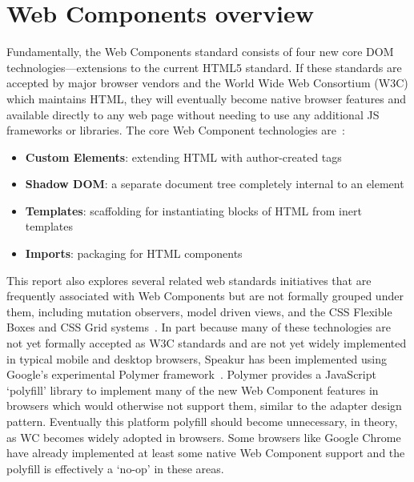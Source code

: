 \section{Web Components overview}
Fundamentally, the Web Components standard consists of four new core DOM technologies---extensions to the current HTML5 standard.
If these standards are accepted by major browser vendors and the World Wide Web Consortium (W3C)
which maintains HTML, 
they will eventually become native browser features and available directly to any web page without needing to use any additional JS frameworks or libraries. 
The core Web Component technologies are~\cite{penades2015}:
\begin{itemize}
\item
\textbf{Custom Elements}: extending HTML with author-created tags
\item
\textbf{Shadow DOM}: a separate document tree completely internal to an element
\item
\textbf{Templates}: scaffolding for instantiating blocks of HTML from inert templates
\item
\textbf{Imports}: packaging for HTML components
\end{itemize}

This report also explores several related web standards initiatives that are frequently associated with Web Components 
but are not formally grouped under them, including mutation observers,
model driven views, 
and the CSS Flexible Boxes
and CSS Grid
systems~\cite{w3ccontributors2014,w3ccontributors2015-d,mozillacontributors2015}. 
In part because many of these technologies are not yet formally accepted as W3C standards and are not yet widely implemented in typical mobile and desktop browsers, 
Speakur has been implemented using Google's experimental Polymer framework~\cite{polymercontributors2015}.
Polymer provides a JavaScript `polyfill'
library to implement many of the new Web Component features in browsers which would otherwise not support them, 
similar to the adapter design pattern. 
Eventually this platform polyfill should become unnecessary, in theory, as WC becomes widely adopted in browsers.
Some browsers like Google Chrome 
have already implemented at least some native 
Web Component support 
and the polyfill is effectively a `no-op' in these areas.

